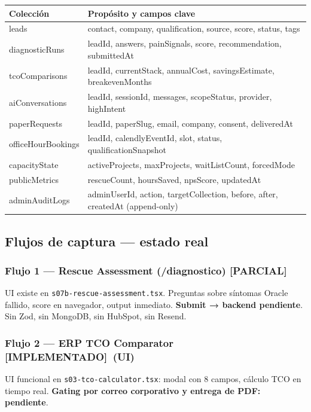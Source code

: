 \documentclass[11pt, a4paper]{article}
\newcommand{\ruta}[1]{\texttt{\color{accent2}#1}}
\newcommand{\implementadotag}{\textbf{\color{accent}[IMPLEMENTADO]}}
\newcommand{\parcialtag}{\textbf{\color{accent2}[PARCIAL]}}
\begin{document}
\begin{table}[h]
\centering
\begin{tabularx}{\linewidth}{>{\ttfamily\color{accent2}\small}l X}
\toprule
Colección & Propósito y campos clave \\
\midrule
leads &
  contact, company, qualification, source, score, status, tags \\
diagnosticRuns &
  leadId, answers, painSignals, score, recommendation, submittedAt \\
tcoComparisons &
  leadId, currentStack, annualCost, savingsEstimate, breakevenMonths \\
aiConversations &
  leadId, sessionId, messages, scopeStatus, provider, highIntent \\
paperRequests &
  leadId, paperSlug, email, company, consent, deliveredAt \\
officeHourBookings &
  leadId, calendlyEventId, slot, status, qualificationSnapshot \\
capacityState &
  activeProjects, maxProjects, waitListCount, forcedMode \\
publicMetrics &
  rescueCount, hoursSaved, npsScore, updatedAt \\
adminAuditLogs &
  adminUserId, action, targetCollection, before, after, createdAt (append-only) \\
\bottomrule
\end{tabularx}
\end{table}

\subsection{Flujos de captura — estado real}

\subsubsection{Flujo 1 — Rescue Assessment (/diagnostico) \parcialtag}

UI existe en \ruta{s07b-rescue-assessment.tsx}. Preguntas sobre síntomas Oracle fallido,
score en navegador, output inmediato. \textbf{Submit → backend pendiente}. Sin Zod, sin
MongoDB, sin HubSpot, sin Resend.

\subsubsection{Flujo 2 — ERP TCO Comparator \implementadotag\ (UI)}

UI funcional en \ruta{s03-tco-calculator.tsx}: modal con 8 campos, cálculo TCO en
tiempo real. \textbf{Gating por correo corporativo y entrega de PDF: pendiente}.
\end{document}
